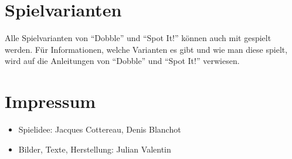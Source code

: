 \documentclass[paper=81mm:81mm]{scrartcl}
\newcommand*{\symbolName}{\read\symbolNamesread to \symbolNameTemp\symbolNameTemp}
\newcounter{symbolImageNumber}
\newcounter{symbolImageRow}
\newlength{\symbolImageLeft}
\newlength{\symbolImageBottom}
\newlength{\symbolImageRight}
\newlength{\symbolImageTop}
\newcommand*{\symbolImagePath}{symbols.pdf}
\newcommand*{\symbolImagePath}{symbols.template.pdf}
\newcommand*{\symbolImage}[2]{%
  \setcounter{symbolImageRow}{\thesymbolImageNumber/6}%
  \setlength{\symbolImageLeft}{100mm*(\thesymbolImageNumber-6*\thesymbolImageRow)+50mm-100mm*\real{#1}/2}%
  \setlength{\symbolImageBottom}{100mm*(5-\thesymbolImageRow)+50mm-100mm*\real{#2}/2}%
  \setlength{\symbolImageRight}{\symbolImageLeft+100mm*\real{#1}}%
  \setlength{\symbolImageTop}{\symbolImageBottom+100mm*\real{#2}}%
  \texttt{[image: \\symbolImagePath]}%
  \addtocounter{symbolImageNumber}{1}%
}
\begin{document}
{\begin{center}
    \vspace*{\fill}
  \end{center}

  \pagebreak

  \begin{center}
    \vspace*{\fill}


    \vspace*{\fill}
  \end{center}

  \pagebreak

  \begin{center}
    \vspace*{\fill}


    \vspace*{\fill}
  \end{center}
}

\section*{Spielvarianten}

Alle Spielvarianten von "`Dobble"' und "`Spot It!"' können auch mit \theda{} gespielt werden.
Für Informationen, welche Varianten es gibt und wie man diese spielt, wird auf die Anleitungen
von "`Dobble"' und "`Spot It!"' verwiesen.

\section*{Impressum}

\begin{itemize}
  \item
  Spielidee: Jacques Cottereau, Denis Blanchot

  \item
  Bilder, Texte, Herstellung: Julian Valentin
\end{itemize}
\end{document}
